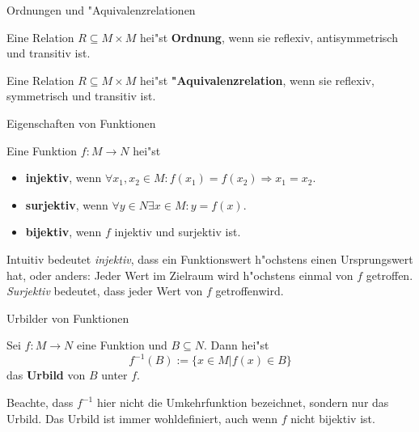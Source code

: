 \documentclass{beamer}
\begin{document}
  \begin{frame}{Ordnungen und "Aquivalenzrelationen}
    \begin{definition}[Ordnungen]
      Eine Relation $R\subseteq M\times M$ hei"st \textbf{Ordnung}, wenn sie reflexiv, antisymmetrisch und transitiv ist.
    \end{definition}
    \begin{definition}["Aquivalenzrelationen]
      Eine Relation $R\subseteq M\times M$ hei"st \textbf{"Aquivalenzrelation}, wenn sie reflexiv, symmetrisch und transitiv ist.
    \end{definition}
  \end{frame}
\begin{frame}{Eigenschaften von Funktionen}
\begin{definition}
  Eine Funktion $f:M\to N$ hei"st 
  \begin{itemize}
    \item \textbf{injektiv}, wenn $\forall x_1,x_2\in M:f(x_1)=f(x_2)\Rightarrow x_1=x_2$.
    \item \textbf{surjektiv}, wenn $\forall y\in N\exists x\in M:y=f(x)$.
    \item \textbf{bijektiv}, wenn $f$ injektiv und surjektiv ist.
  \end{itemize}
\end{definition}
Intuitiv bedeutet \textit{injektiv}, dass ein Funktionswert h"ochstens einen Ursprungswert hat, oder anders: Jeder Wert im Zielraum wird h"ochstens einmal von $f$ \glqq getroffen\grqq. \textit{Surjektiv} bedeutet, dass jeder Wert von $f$ \glqq getroffen\grqq wird.
\end{frame}
\begin{frame}{Urbilder von Funktionen}
  \begin{definition}[Urbild]
    Sei $f:M\to N$ eine Funktion und $B\subseteq N$. Dann hei"st \[f^{-1}(B):=\{x\in M|f(x)\in B\}\] das \textbf{Urbild} von $B$ unter $f$.
  \end{definition}
  Beachte, dass $f^{-1}$ hier nicht die Umkehrfunktion bezeichnet, sondern nur das Urbild. Das Urbild ist immer wohldefiniert, auch wenn $f$ nicht bijektiv ist.
  \end{frame}
\end{document}
